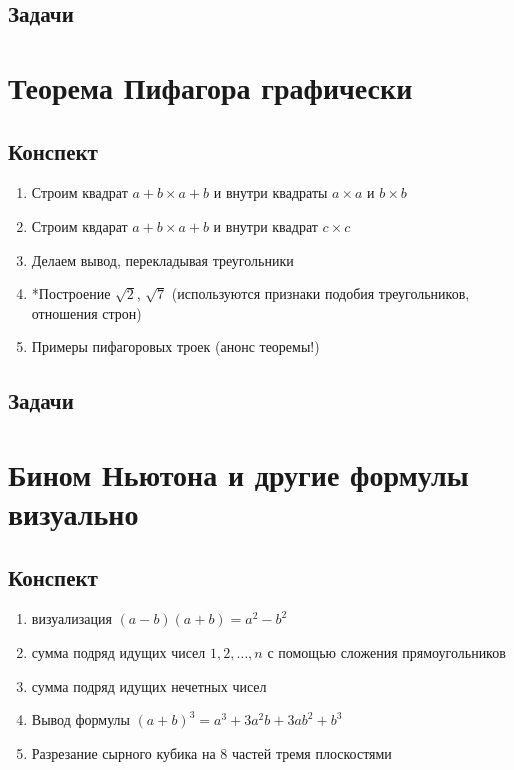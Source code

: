 \subsection{Задачи}



\section{Теорема Пифагора графически}

\subsection{Конспект}
\begin{enumerate}\setlength{\itemsep}{1pt}
\item Строим квадрат $a+b\times a+b$ и внутри квадраты $a\times a$ и $b\times b$
\item Строим квдарат $a+b\times a+b$ и внутри квадрат $c\times c$
\item Делаем вывод, перекладывая треугольники
\item *Построение $\sqrt 2$, $\sqrt 7$ (используются признаки подобия треугольников, отношения строн)
\item Примеры пифагоровых троек (анонс теоремы!)
\end{enumerate}
\subsection{Задачи}

\section{Бином Ньютона и другие формулы визуально}

\subsection{Конспект}
\begin{enumerate}\setlength{\itemsep}{1pt}
\item визуализация $(a-b)(a+b)=a^2-b^2$
\item сумма подряд идущих чисел $1,2,\dots,n$ с помощью сложения прямоугольников
\item сумма подряд идущих нечетных чисел
\item Вывод формулы $(a+b)^3 = a^3+3a^2b+3ab^2+b^3$
\item Разрезание сырного кубика на 8 частей тремя плоскостями
\end{enumerate}

